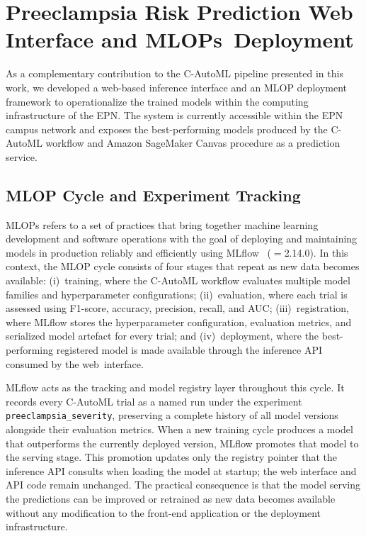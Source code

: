 \documentclass[diagnostics,article,accept,pdftex,moreauthors]{Definitions/mdpi}
\begin{document}
\section[\appendixname~\thesection]{Preeclampsia Risk Prediction Web Interface and MLOPs~Deployment}
\label{app:mlops-interface}


As a complementary contribution to the \ac{C-AutoML} pipeline
presented in this work, we developed a web-based inference interface
and an MLOP deployment framework to operationalize the trained
models within the computing infrastructure of the \ac{EPN}. The system is currently accessible within the \ac{EPN} campus network and exposes the best-performing models produced by the \ac{C-AutoML} workflow and Amazon SageMaker Canvas procedure as a prediction service.

\subsection[\appendixname~\thesubsection]{MLOP Cycle and Experiment Tracking}

\ac{MLOPs} refers to a set of practices that bring together machine
learning development and software operations with the goal of
deploying and maintaining models in production reliably and
efficiently using MLflow~\cite{mlflow_2018}
($=${2.14.0}). %
In this context, the MLOP cycle consists of four stages that repeat as
new data becomes available: (i)~training, where the \ac{C-AutoML}
workflow evaluates multiple model families and hyperparameter
configurations; (ii)~evaluation, where each trial is assessed using
F1-score, accuracy, precision, recall, and \ac{AUC};
(iii)~registration, where MLflow stores the hyperparameter
configuration, evaluation metrics, and serialized model artefact for
every trial; and (iv)~deployment, where the best-performing registered
model is made available through the inference \ac{API} consumed by the
\mbox{web interface.}

MLflow acts as the tracking and model registry layer throughout this
cycle. It records every \ac{C-AutoML} trial as a named run under the
experiment \texttt{preeclampsia\_severity}, preserving a complete
history of all model versions alongside their evaluation metrics.
When a new training cycle produces a model that outperforms the
currently deployed version, MLflow promotes that model to the serving
stage. This promotion updates only the registry pointer that the
inference \ac{API} consults when loading the model at startup; the
web interface and \ac{API} code remain unchanged. The practical
consequence is that the model serving the predictions can be improved
or retrained as new data becomes available without any modification
to the front-end application or the deployment infrastructure.
\end{document}
